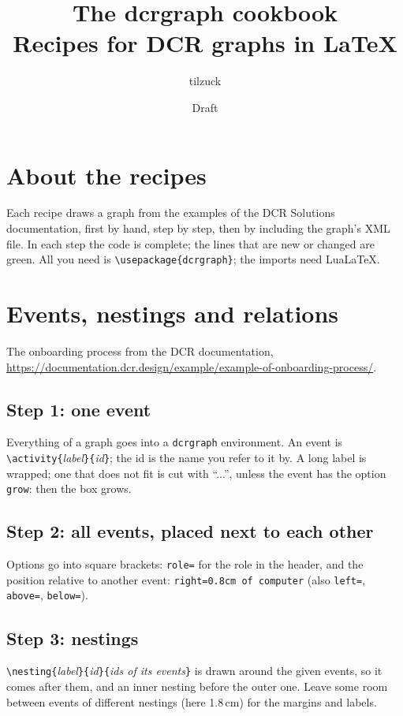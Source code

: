 \documentclass[a4paper,11pt]{article}
\title{The \textsf{dcrgraph} cookbook\\[4pt]
  \large Recipes for DCR graphs in \LaTeX}
\author{tilzuck}
\date{Draft}
\newcommand\example[1]{%
  \begin{tcolorbox}[enhanced, breakable, colback=white, colframe=black!25,
      boxrule=0.4pt, arc=1mm, left=2mm, right=2mm, halign lower=center]
    
    \tcblower
  \end{tcolorbox}}
\newcommand\cs[1]{\texttt{\textbackslash#1}}
\newcommand\key[1]{\texttt{#1}}
\newcommand\new{\textcolor{newcode}{green}}
\begin{document}
\maketitle
\tableofcontents

\section*{About the recipes}
Each recipe draws a graph from the examples of the DCR Solutions
documentation, first by hand, step by step, then by including the
graph's XML file. In each step the code is complete; the lines that are
new or changed are \new. All you need is \cs{usepackage\{dcrgraph\}}; the
imports need LuaLaTeX.

\section{Events, nestings and relations}
The onboarding process from the DCR documentation,
\url{https://documentation.dcr.design/example/example-of-onboarding-process/}.

\subsection{Step 1: one event}
Everything of a graph goes into a \texttt{dcrgraph} environment. An event is
\cs{activity\{}\textit{label}\texttt{\}\{}\textit{id}\texttt{\}}; the id is the
name you refer to it by. A long label is wrapped; one that does not fit is
cut with ``...'', unless the event has the option \key{grow}: then the box
grows.
\example{onboarding-1}

\subsection{Step 2: all events, placed next to each other}
Options go into square brackets: \key{role=} for the role in the header,
and the position relative to another event: \key{right=0.8cm of computer}
(also \key{left=}, \key{above=}, \key{below=}).
\example{onboarding-2}

\subsection{Step 3: nestings}
\cs{nesting\{}\textit{label}\texttt{\}\{}\textit{id}\texttt{\}\{}\textit{ids of its
events}\texttt{\}} is drawn around the given events, so it comes after them,
and an inner nesting before the outer one. Leave some room between events
of different nestings (here 1.8\,cm) for the margins and labels.
\example{onboarding-3}
\end{document}
